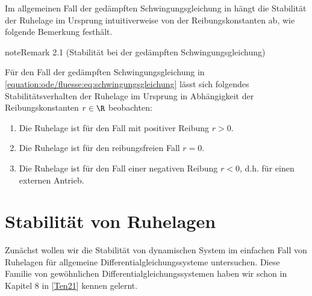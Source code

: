 \documentclass[letterpaper,10pt,english]{jupyterBook}
\begin{document}
\sphinxAtStartPar
Im allgemeinen Fall der gedämpften Schwingungsgleichung in {\hyperref[\detokenize{ode/fluesse:ex:oscillations}]{}} hängt die Stabilität der Ruhelage im Ursprung intuitiverweise von der Reibungskonstanten ab, wie folgende Bemerkung festhält.
\label{odestability/stabilitaetsbegriffe:remark-2}
\begin{sphinxadmonition}{note}{Remark 2.1 (Stabilität bei der gedämpften Schwingungsgleichung)}



\sphinxAtStartPar
Für den Fall der gedämpften Schwingungsgleichung in \eqref{equation:ode/fluesse:eq:schwingungsgleichung} lässt sich folgendes Stabilitätsverhalten der Ruhelage im Ursprung in Abhängigkeit der Reibungskonstanten \(r \in \R\) beobachten:
\begin{enumerate}
%
\item {} 
\sphinxAtStartPar
Die Ruhelage ist  für den Fall mit positiver Reibung \(r>0\).

\item {} 
\sphinxAtStartPar
Die Ruhelage ist  für den reibungsfreien Fall \(r=0\).

\item {} 
\sphinxAtStartPar
Die Ruhelage ist  für den Fall einer negativen Reibung \(r < 0\), d.h. für einen externen Antrieb.

\end{enumerate}
\end{sphinxadmonition}


\section{Stabilität von Ruhelagen}
\label{\detokenize{odestability/ruhelagen:stabilitat-von-ruhelagen}}\label{\detokenize{odestability/ruhelagen::doc}}
\sphinxAtStartPar
Zunächst wollen wir die Stabilität von dynamischen System im einfachen Fall von Ruhelagen für allgemeine  Differentialgleichungssysteme untersuchen.
Diese Familie von gewöhnlichen Differentialgleichungssystemen haben wir schon in Kapitel 8 in {[}\hyperlink{cite.references:id12}{Ten21}{]} kennen gelernt.
\end{document}
